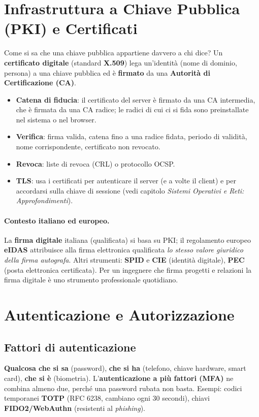 \section{Infrastruttura a Chiave Pubblica (PKI) e Certificati}
Come si sa che una chiave pubblica appartiene davvero a chi dice? Un \textbf{certificato digitale} (standard \textbf{X.509}) lega un'identità (nome di dominio, persona) a una chiave pubblica ed è \textbf{firmato} da una \textbf{Autorità di Certificazione (CA)}.
\begin{itemize}
    \item \textbf{Catena di fiducia}: il certificato del server è firmato da una CA intermedia, che è firmata da una CA radice; le radici di cui ci si fida sono preinstallate nel sistema o nel browser.
    \item \textbf{Verifica}: firma valida, catena fino a una radice fidata, periodo di validità, nome corrispondente, certificato non revocato.
    \item \textbf{Revoca}: liste di revoca (CRL) o protocollo OCSP.
    \item \textbf{TLS}: usa i certificati per autenticare il server (e a volte il client) e per accordarsi sulla chiave di sessione (vedi capitolo \emph{Sistemi Operativi e Reti: Approfondimenti}).
\end{itemize}

\paragraph{Contesto italiano ed europeo.} La \textbf{firma digitale} italiana (qualificata) si basa su PKI; il regolamento europeo \textbf{eIDAS} attribuisce alla firma elettronica qualificata \emph{lo stesso valore giuridico della firma autografa}. Altri strumenti: \textbf{SPID} e \textbf{CIE} (identità digitale), \textbf{PEC} (posta elettronica certificata). Per un ingegnere che firma progetti e relazioni la firma digitale è uno strumento professionale quotidiano.

\section{Autenticazione e Autorizzazione}

\subsection{Fattori di autenticazione}
\textbf{Qualcosa che si sa} (password), \textbf{che si ha} (telefono, chiave hardware, smart card), \textbf{che si è} (biometria). L'\textbf{autenticazione a più fattori (MFA)} ne combina almeno due, perché una password rubata non basta. Esempi: codici temporanei \textbf{TOTP} (RFC 6238, cambiano ogni 30 secondi), chiavi \textbf{FIDO2/WebAuthn} (resistenti al \emph{phishing}).

